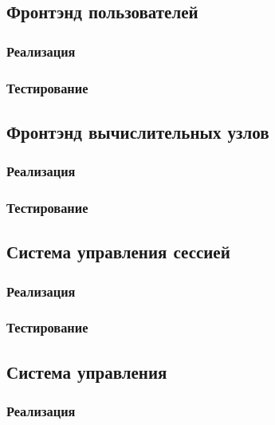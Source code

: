 \documentclass[a4paper,12pt]{report}
\numberwithin{equation}{section}
\begin{document}




\subsection{Фронтэнд пользователей}
\subsubsection{Реализация}

\subsubsection{Тестирование}

\subsection{Фронтэнд вычислительных узлов}
\subsubsection{Реализация}

\subsubsection{Тестирование}
\subsection{Система управления сессией}
\subsubsection{Реализация}

\subsubsection{Тестирование}

\subsection{Система управления}
\subsubsection{Реализация}
\end{document}
